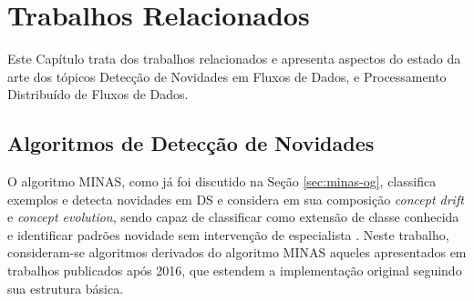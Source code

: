 \chapter{Trabalhos Relacionados}\label{cha:related}



\begin{resumocap}

Este Capítulo trata dos trabalhos relacionados e apresenta aspectos do estado da arte
dos tópicos Detecção de Novidades em Fluxos de Dados, e
Processamento Distribuído de Fluxos de Dados.

\end{resumocap}


\section{Algoritmos de Detecção de Novidades}\label{sec:alg-nd}

\newcommand{\cluster}{\emph{cluster}\xspace}
\newcommand{\clusters}{\emph{clusters}\xspace}

\newcommand{\dataset}{\emph{data set}\xspace}
\newcommand{\datasets}{\emph{data sets}\xspace}

O algoritmo MINAS, como já foi discutido na Seção \ref{sec:minas-og}, classifica
exemplos e detecta
novidades em DS e considera em sua composição \emph{concept drift} e
\emph{concept evolution}, sendo capaz de classificar como extensão de classe
conhecida e identificar padrões novidade sem intervenção de especialista
\cite{Faria2016minas}.
Neste trabalho, consideram-se algoritmos derivados do algoritmo MINAS
aqueles apresentados em trabalhos publicados após 2016, que estendem a
implementação original seguindo sua estrutura básica.

